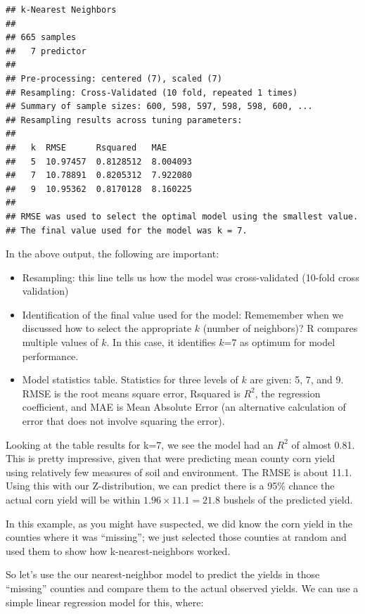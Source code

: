 \documentclass[
]{book}
\providecommand{\tightlist}{%
  \setlength{\itemsep}{0pt}\setlength{\parskip}{0pt}}
\begin{document}
\begin{verbatim}
## k-Nearest Neighbors 
## 
## 665 samples
##   7 predictor
## 
## Pre-processing: centered (7), scaled (7) 
## Resampling: Cross-Validated (10 fold, repeated 1 times) 
## Summary of sample sizes: 600, 598, 597, 598, 598, 600, ... 
## Resampling results across tuning parameters:
## 
##   k  RMSE      Rsquared   MAE     
##   5  10.97457  0.8128512  8.004093
##   7  10.78891  0.8205312  7.922080
##   9  10.95362  0.8170128  8.160225
## 
## RMSE was used to select the optimal model using the smallest value.
## The final value used for the model was k = 7.
\end{verbatim}

In the above output, the following are important:

\begin{itemize}
\tightlist
\item
  Resampling: this line tells us how the model was cross-validated (10-fold cross validation)
\item
  Identification of the final value used for the model: Rememember when we discussed how to select the appropriate \(k\) (number of neighbors)? R compares multiple values of \(k\). In this case, it identifies \(k\)=7 as optimum for model performance.\\
\item
  Model statistics table. Statistics for three levels of \(k\) are given: 5, 7, and 9. RMSE is the root means square error, Rsquared is \(R^2\), the regression coefficient, and MAE is Mean Absolute Error (an alternative calculation of error that does not involve squaring the error).
\end{itemize}

Looking at the table results for k=7, we see the model had an \(R^2\) of almost 0.81. This is pretty impressive, given that were predicting mean county corn yield using relatively few measures of soil and environment. The RMSE is about 11.1. Using this with our Z-distribution, we can predict there is a 95\% chance the actual corn yield will be within \(1.96 \times11.1=21.8\) bushels of the predicted yield.

In this example, as you might have suspected, we did know the corn yield in the counties where it was ``missing''; we just selected those counties at random and used them to show how k-nearest-neighbors worked.

So let's use the our nearest-neighbor model to predict the yields in those ``missing'' counties and compare them to the actual observed yields. We can use a simple linear regression model for this, where:
\end{document}
